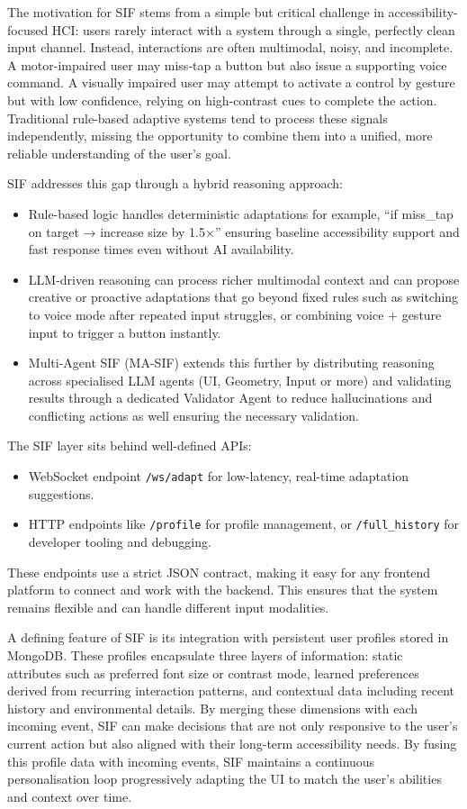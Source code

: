 \documentclass[openany]{book}
\begin{document}
The motivation for SIF stems from a simple but critical challenge in accessibility-focused HCI:
users rarely interact with a system through a single, perfectly clean input channel. Instead, interactions are often multimodal, noisy, and incomplete. A motor-impaired user may miss-tap a button but also issue a supporting voice command. A visually impaired user may attempt to activate a control by gesture but with low confidence, relying on high-contrast cues to complete the action. Traditional rule-based adaptive systems tend to process these signals independently, missing the opportunity to combine them into a unified, more reliable understanding of the user’s goal.

SIF addresses this gap through a hybrid reasoning approach:
\begin{itemize}
    \item Rule-based logic handles deterministic adaptations for example, “if miss\_tap on target → increase size by 1.5×” ensuring baseline accessibility support and fast response times even without AI availability.
    \item LLM-driven reasoning can process richer multimodal context and can propose creative or proactive adaptations that go beyond fixed rules such as switching to voice mode after repeated input struggles, or combining voice + gesture input to trigger a button instantly.
    \item Multi-Agent SIF (MA-SIF) extends this further by distributing reasoning across specialised LLM agents (UI, Geometry, Input or more) and validating results through a dedicated Validator Agent to reduce hallucinations and conflicting actions as well ensuring the necessary validation.
\end{itemize}

The SIF layer sits behind well-defined APIs:
\begin{itemize}
    \item WebSocket endpoint \texttt{/ws/adapt} for low-latency, real-time adaptation suggestions.
    \item HTTP endpoints like \texttt{/profile} for profile management, or \texttt{/full\_history} for developer tooling and debugging.
\end{itemize}
These endpoints use a strict JSON contract, making it easy for any frontend platform to connect and work with the backend. This ensures that the system remains flexible and can handle different input modalities.

A defining feature of SIF is its integration with persistent user profiles stored in MongoDB. These profiles encapsulate three layers of information: static attributes such as preferred font size or contrast mode, learned preferences derived from recurring interaction patterns, and contextual data including recent history and environmental details. By merging these dimensions with each incoming event, SIF can make decisions that are not only responsive to the user’s current action but also aligned with their long-term accessibility needs.
By fusing this profile data with incoming events, SIF maintains a continuous personalisation loop progressively adapting the UI to match the user’s abilities and context over time.
\end{document}

